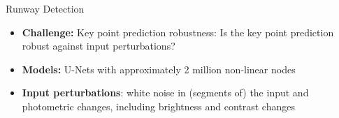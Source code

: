 \documentclass[10pt]{beamer}
\begin{document}


\begin{frame}{Runway Detection}
\begin{itemize}

    \item {\bf Challenge:} Key point prediction robustness: Is the key point prediction robust against input perturbations?
    \item {\bf Models:} U-Nets with approximately 2 million non-linear nodes
    \item {\bf Input perturbations}: white noise in (segments of) the input and photometric changes, including brightness and contrast changes
    \vspace{1em}
    \begin{figure}
    \end{figure}

    \end{itemize}

\end{frame}

\end{document}
